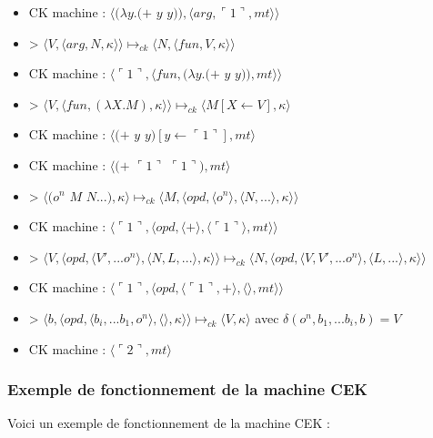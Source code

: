 \documentclass[10pt,a4paper]{article}
\begin{document}
\begin{itemize}
					\item[] CK machine : $\langle(\lambda y.(+$ $y$ $y)),\langle arg,\ulcorner 1\urcorner,mt\rangle\rangle$	
					\item[] > $\langle V,\langle arg,N,\kappa \rangle \rangle \longmapsto_{ck} \langle N,\langle fun,V,\kappa \rangle \rangle$
					\item[] CK machine : $\langle\ulcorner 1\urcorner,\langle fun,(\lambda y.(+$ $y$ $y)),mt\rangle\rangle$	
					\item[] > $\langle V,\langle fun,(\lambda X.M),\kappa \rangle \rangle \longmapsto_{ck} \langle M[X \leftarrow V],\kappa\rangle$	
					\item[] CK machine : $\langle(+$ $y$ $y)[y \leftarrow\ulcorner 1\urcorner],mt\rangle$
					\item[] CK machine : $\langle(+$ $\ulcorner 1\urcorner$ $\ulcorner 1\urcorner),mt\rangle$
					\item[] > $\langle(o^{n}$ $M$ $N...),\kappa\rangle \longmapsto_{ck} \langle M,\langle opd,\langle o^{n}\rangle,\langle N,...\rangle,\kappa\rangle\rangle$
					\item[] CK machine : $\langle\ulcorner 1\urcorner,\langle opd,\langle + \rangle,\langle\ulcorner 1\urcorner\rangle,mt\rangle\rangle$
					\item[] > $\langle V,\langle opd,\langle V',...o^{n}\rangle,\langle N,L,...\rangle,\kappa\rangle\rangle \longmapsto_{ck} \langle N,\langle opd,\langle V,V',...o^{n}\rangle,\langle L,...\rangle,\kappa\rangle\rangle$
					\item[] CK machine : $\langle\ulcorner 1\urcorner,\langle opd,\langle\ulcorner 1\urcorner,+ \rangle,\langle\rangle,mt\rangle\rangle$
					\item[] > $\langle b,\langle opd,\langle b_{i},...b_{1},o^{n}\rangle,\langle\rangle,\kappa\rangle\rangle \longmapsto_{ck} \langle V,\kappa\rangle$ avec $\delta(o^{n},b_{1},...b_{i},b) = V$
					\item[] CK machine : $\langle\ulcorner 2\urcorner,mt\rangle$
				\end{itemize}
				\newpage
			
			
				
			\subsubsection{Exemple de fonctionnement de la machine CEK}\label{CEK}
					
				Voici un exemple de fonctionnement de la machine CEK :
					
\end{document}
